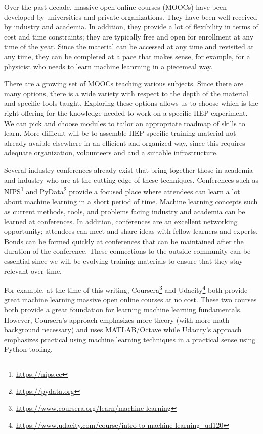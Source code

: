 \documentclass[12pt,a4paper]{article}
\begin{document}

Over the past decade, massive open online courses (MOOCs) have been developed by
universities and private organizations. They have been well received by industry
and academia.%
In addition, they provide a lot of flexibility in terms of cost and time
constraints; they are typically free and open for enrollment at any time of the
year. Since the material can be accessed at any time and revisited at any time,
they can be completed at a pace that makes sense, for example, for a physicist
who needs to learn machine leanrning in a piecemeal way.

There are a growing set of MOOCs teaching various subjects. Since there are many
options, there is a wide variety with respect to the depth of the material and
specific tools taught. Exploring these options allows us to choose which is the
right offering for the knowledge needed to work on a specific HEP experiment. We
can pick and choose modules to tailor an appropriate roadmap of skills to learn.
More difficult will be to assemble HEP specific training material not already
avaible elsewhere in an efficient and organized way, since this requires
adequate organization, volounteers and and a suitable infrastructure.

Several industry conferences already exist that bring together those in academia
and industry who are at the cutting edge of these techniques. Conferences such
as NIPS\footnote{\url{https://nips.cc}} and
PyData\footnote{\url{https://pydata.org}} provide a focused place where
attendees can learn a lot about machine learning in a short period of time.
Machine learning concepts such as current methods, tools, and problems facing
industry and academia can be learned at conferences. In addition, conferences
are an excellent networking opportunity; attendees can meet and share ideas with
fellow learners and experts. Bonds can be formed quickly at conferences that can
be maintained after the duration of the conference. These connections to the
outside community can be essential since we will be evolving training materials
to ensure that they stay relevant over time.

For example, at the time of this writing,
Coursera\footnote{\url{https://www.coursera.org/learn/machine-learning}} and
Udacity\footnote{\url{https://www.udacity.com/course/intro-to-machine-learning--ud120}}
both provide great machine learning massive open online courses at no cost.
These two courses both provide a great foundation for learning machine learning
fundamentals. However, Coursera's approach emphasizes more theory (with more
math background necessary) and uses MATLAB/Octave while Udacity's approach
emphasizes practical using machine learning techniques in a practical sense
using Python tooling.
\end{document}
